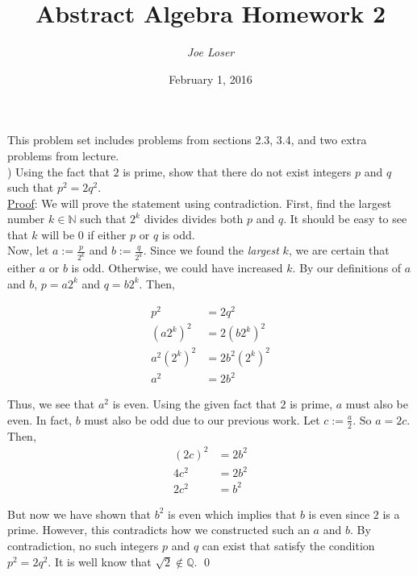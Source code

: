 \documentclass{article}
\title{Abstract Algebra Homework 2}
\author{\textit{Joe Loser}}
\date{February 1, 2016}
\begin{document}
\maketitle

\noindent This problem set includes problems from sections 2.3, 3.4, and two extra problems from lecture.  \\

) Using the fact that $2$ is prime, show that there do not exist integers $p$ and $q$ such that $p^{2} = 2q^{2}$. \\

\noindent
\underline{Proof}: We will prove the statement using contradiction. First, find the largest number $k \in \mathbb{N}$ such that $2^{k}$ divides divides both $p$ and $q$.  It should be easy to see that $k$ will be $0$ if either $p$ or $q$ is odd. \\

\noindent
Now, let $a := \frac{p}{2^{k}}$ and $b := \frac{q}{2^{k}}$. Since we found the \textit{largest} $k$, we are certain that either $a$ or $b$ is odd.  Otherwise, we could have increased $k$. By our definitions of $a$ and $b$, $p = a 2^{k}$ and $q = b 2^{k}$. Then,

\begin{align*}
p^{2} &= 2q^{2} \\
(a 2^{k})^{2} &= 2(b 2^{k})^{2} \\
a^{2} (2^{k})^{2} &= 2b^{2}(2^{k})^2 \\
a^{2} &= 2b^{2}
\end{align*}

\noindent
Thus, we see that $a^{2}$ is even.  Using the given fact that $2$ is prime, $a$ must also be even. In fact, $b$ must also be odd due to our previous work. Let $c := \frac{a}{2}$. So $a = 2c$. Then,
\begin{align*}
(2c)^{2} &= 2b^{2} \\
4c^{2} &= 2b^{2} \\
2c^{2} &= b^{2}
\end{align*}

\noindent
But now we have shown that $b^{2}$ is even which implies that $b$ is even since $2$ is a prime. However, this contradicts how we constructed such an $a$ and $b$. By contradiction, no such integers $p$ and $q$ can exist that satisfy the condition $p^{2} = 2q^{2}$. It is well know that $\sqrt{2} \not \in \mathbb{Q}$. \qed \\ \\ \\
\end{document}
